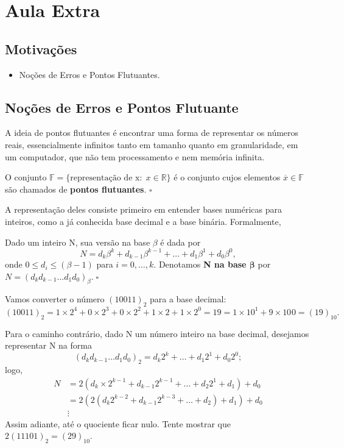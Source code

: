 \documentclass[../numerical_methods.tex]{subfiles}
\begin{document}
\section{Aula Extra}
\subsection{Motivações}
\begin{itemize}
	\item Noções de Erros e Pontos Flutuantes.
\end{itemize}
\subsection{Noções de Erros e Pontos Flutuante}
A ideia de pontos flutuantes é encontrar uma forma de representar os números reais, essencialmente infinitos tanto em tamanho quanto em granularidade, em um computador, que não tem processamento e nem memória infinita.
\begin{def*}
	O conjunto \(\mathbb{F} = \{\text{representação de x}:\; x\in \mathbb{R}\}\) é o conjunto cujos elementos \(\overline{x}\in \mathbb{F}\) são chamados de \textbf{pontos flutuantes}. \(\square\)
\end{def*}
A representação deles consiste primeiro em entender bases numéricas para inteiros, como a já conhecida base decimal e a base binária. Formalmente,
\begin{def*}
	Dado um inteiro N, sua versão na base \(\beta \) é dada por
	\[
		N = d_{k}\beta^{k}+d_{k-1}\beta^{k-1} +\dotsc +d_1\beta^{1} + d_{0}\beta^{0},
	\]
	onde \(0\leq d_{i}\leq (\beta-1)\) para \(i=0, \dotsc , k\). Denotamos \textbf{N na base \(\mathbf{\beta }\)} por \(N = (d_kd_{k-1}\dotsc d_1d_0)_\beta. \; \square\)
\end{def*}
\begin{example}
	Vamos converter o número \((10011)_{2}\) para a base decimal:
	\[
		(10011)_{2} = 1 \times 2^{4} + 0 \times 2^{3} + 0 \times 2^{2} + 1 \times 2 + 1\times 2^{0} = 19 = 1\times 10^{1} + 9\times 10^{}0 = (19)_{10}.
	\]


	Para o caminho contrário, dado N um número inteiro na base decimal, desejamos representar N na forma
	\[
		(d_k d_{k-1}\dotsc d_1d_0)_{2} = d_{k}2^{k}+\dotsc +d_1 2^{1} + d_{0}2^{0};
	\]
	logo,
	\begin{align*}
		N & = 2 (d_k \times 2^{k-1} + d_{k-1}2^{k-1}+\dotsc +d_2 2^{1} + d_1) + d_{0} \\
		  & = 2 (2 (d_{k} 2^{k-2} + d_{k-1}2^{k-3}+\dotsc +d_2)+d_1)+d_0              \\
		  & \vdots
	\end{align*}
	Assim adiante, até o quociente ficar nulo. Tente mostrar que \(2(11101)_{2} = (29)_{10}.\)
\end{example}
\end{document}
